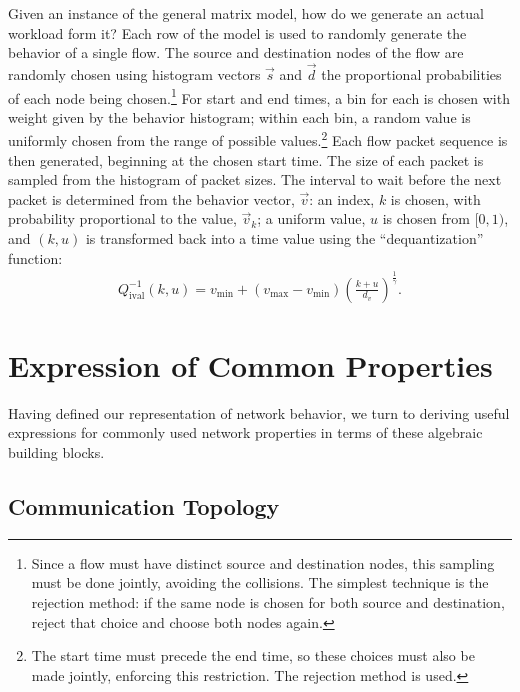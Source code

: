 \documentclass[conference]{IEEEtran}
\newcommand{\Di}{Q^{-1}_{\text{ival}}}
\begin{document}
Given an instance of the general matrix model, how do we generate an actual workload form it? Each row of the model is used to randomly generate the behavior of a single flow. The source and destination nodes of the flow are randomly chosen using histogram vectors $\vec{s}$ and $\vec{d}$ the proportional probabilities of each node being chosen.\footnote{Since a flow must have distinct source and destination nodes, this sampling must be done jointly, avoiding the collisions. The simplest technique is the rejection method: if the same node is chosen for both source and destination, reject that choice and choose both nodes again.}
For start and end times, a bin for each is chosen with weight given by the behavior histogram; within each bin, a random value is uniformly chosen from the range of possible values.\footnote{The start time must precede the end time, so these choices must also be made jointly, enforcing this restriction. The rejection method is used.}
Each flow packet sequence is then generated, beginning at the chosen start time. The size of each packet is sampled from the histogram of packet sizes. The interval to wait before the next packet is determined from the behavior vector, $\vec{v}$: an index, $k$ is chosen, with probability proportional to the value, $\vec{v}_k$; a uniform value, $u$ is chosen from $[0,1)$, and $(k,u)$ is transformed back into a time value using the ``dequantization'' function:
\begin{align}
\label{eqn:interval-dequantization}
\Di(k,u)=v_{\min}+(v_{\max}-v_{\min})\left(\frac{k+u}{d_v}\right)^{\frac{1}{\gamma}}.
\end{align}


\section{Expression of Common Properties}

Having defined our representation of network behavior, we turn to deriving useful expressions for commonly used network properties in terms of these algebraic building blocks.

\subsection{Communication Topology}
\end{document}

